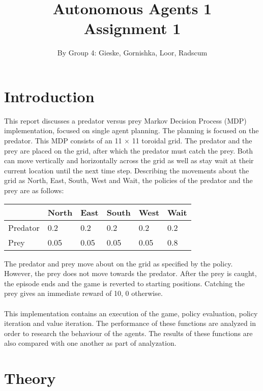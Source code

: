 \documentclass{article}
\begin{document}
\title{Autonomous Agents 1 \\ Assignment 1}

\author{By Group 4: Gieske, Gornishka, Loor, Radscum}
\maketitle

\pagebreak

\section*{Introduction}
This report discusses a predator versus prey Markov Decision Process (MDP) implementation, focused on single agent planning. The planning is focused on the predator. This MDP consists of an 11 $\times$ 11 toroidal grid. The predator and the prey are placed on the grid, after which the  predator must catch the prey. Both can move vertically and horizontally across the grid as well as stay wait at their current location until the next time step. Describing the movements about the grid as North, East, South, West and Wait, the policies of the predator and the prey are as follows:
\begin{center}
	\begin{tabular}{ | l | l | l | l | l | l |}
	\hline
	& North & East & South & West & Wait\\
	\hline
	Predator & 0.2 & 0.2 & 0.2 & 0.2 & 0.2 \\ 
	\hline
	Prey & 0.05 & 0.05 & 0.05 & 0.05 & 0.8 \\
	\hline
	\end{tabular}
\end{center}
The predator and prey move about on the grid as specified by the policy. However, the prey does not move towards the predator. After the prey is caught, the episode ends and the game is reverted to starting positions. Catching the prey gives an immediate reward of 10, 0 otherwise.
\\ \\
This implementation contains an execution of the game, policy evaluation, policy iteration and value iteration. The performance of these functions are analyzed in order to research the behaviour of the agents. The results of these functions are also compared with one another as part of analyzation.

\pagebreak

\section*{Theory}
\end{document}
